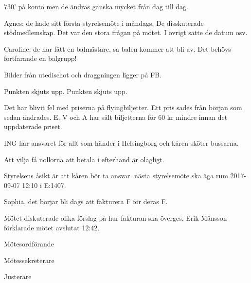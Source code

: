 \documentclass[10pt]{article}
\def\mo{Erik Månsson}
\def\ms{Johan Karlberg}
\def\ji{Sophia }
\begin{document}
\begin{paragrafer}
\begin{paragrafer}
730' på konto men de ändras ganska mycket från dag till dag.

Agnes; de hade sitt första styrelsemöte i måndags. De disskuterade stödmedlemskap. Det var den stora frågan på mötet. I övrigt satte de datum osv.

Caroline; de har fått en balmästare, så balen kommer att bli av. Det behövs fortfarande en balgrupp!

Bilder från utedischot och draggningen ligger på FB.
\end{paragrafer}

Punkten skjuts upp.
Punkten skjuts upp.

Det har blivit fel med priserna på flyingbiljetter. Ett pris sades från början som sedan ändrades. E, V och A har sålt biljetterna för 60 kr mindre innan det uppdaterade priset.

ING har ansvaret för allt som händer i Helsingborg och kåren sköter bussarna.

Att vilja få nollorna att betala i efterhand är olagligt.

Styrelsens åsikt är att kåren bör ta ansvar.
{\Mba} nästa styrelsemöte ska äga rum 2017-09-07 12:10 i E:1407.

{\Ibfu}

Sophia, det börjar bli dags att fakturera F för deras F.

Mötet diskuterade olika förslag på hur fakturan ska överges.
{\mo} förklarade mötet avslutat 12:42.

\end{paragrafer}

\hidesignfoot
\begin{signatures}{3}
\signature{\mo}{Mötesordförande}
\signature{\ms}{Mötessekreterare}
\signature{\ji}{Justerare}
\end{signatures}
\end{document}
